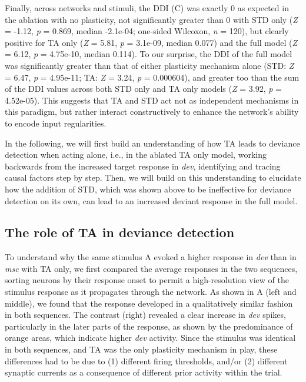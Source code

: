 \documentclass[9pt,lineno,onehalfspacing]{elife}
\newcommand{\dev}{\textit{dev}}
\newcommand{\msc}{\textit{msc}}
\begin{document}
Finally, across networks and stimuli, the DDI (C) was exactly 0 as expected in the ablation with no plasticity, not significantly greater than 0 with STD only (\textit{Z} = -1.12, \textit{p} = 0.869, median -2.1e-04; one-sided Wilcoxon, \textit{n} = 120), but clearly positive for TA only (\textit{Z} = 5.81, \textit{p} = 3.1e-09, median 0.077) and the full model (\textit{Z} = 6.12, \textit{p} = 4.75e-10, median 0.114). To our surprise, the DDI of the full model was significantly greater than that of either plasticity mechanism alone (STD: \textit{Z} = 6.47, \textit{p} = 4.95e-11; TA: \textit{Z} = 3.24, \textit{p} = 0.000604), and greater too than the sum of the DDI values across both STD only and TA only models (\textit{Z} = 3.92, \textit{p} = 4.52e-05). This suggests that TA and STD act not as independent mechanisms in this paradigm, but rather interact constructively to enhance the network's ability to encode input regularities.

In the following, we will first build an understanding of how TA leads to deviance detection when acting alone, i.e., in the ablated TA only model, working backwards from the increased target response in \dev{}, identifying and tracing causal factors step by step. Then, we will build on this understanding to elucidate how the addition of STD, which was shown above to be ineffective for deviance detection on its own, can lead to an increased deviant response in the full model.

\subsection{The role of TA in deviance detection}\label{sec:ta}

To understand why the same stimulus A evoked a higher response in \dev{} than in \msc{} with TA only, we first compared the average responses in the two sequences, sorting neurons by their response onset to permit a high-resolution view of the stimulus response as it propagates through the network. As shown in A (left and middle), we found that the response developed in a qualitatively similar fashion in both sequences. The contrast (right) revealed a clear increase in \dev{} spikes, particularly in the later parts of the response, as shown by the predominance of orange areas, which indicate higher \dev{} activity. Since the stimulus was identical in both sequences, and TA was the only plasticity mechanism in play, these differences had to be due to (1) different firing thresholds, and/or (2) different synaptic currents as a consequence of different prior activity within the trial.
\end{document}
